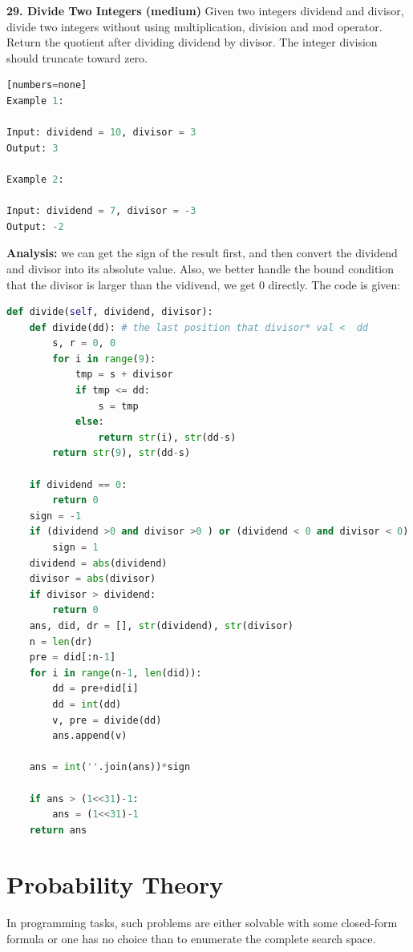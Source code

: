 \documentclass[../main.tex]{subfiles}
\begin{document}
\begin{examples}[resume]
\item \textbf{29. Divide Two Integers (medium)} Given two integers dividend and divisor, divide two integers without using multiplication, division and mod operator. Return the quotient after dividing dividend by divisor. The integer division should truncate toward zero.
\begin{lstlisting}[language=Python][numbers=none]
Example 1:

Input: dividend = 10, divisor = 3
Output: 3

Example 2:

Input: dividend = 7, divisor = -3
Output: -2
\end{lstlisting}

\textbf{Analysis:} we can get the sign of the result first, and then convert the dividend and divisor into its absolute value. Also, we better handle the bound condition that the divisor is larger than the vidivend, we get 0 directly. The code is given:
\begin{lstlisting}[language=Python]
def divide(self, dividend, divisor):
    def divide(dd): # the last position that divisor* val <  dd
        s, r = 0, 0
        for i in range(9):
            tmp = s + divisor
            if tmp <= dd:
                s = tmp
            else:
                return str(i), str(dd-s)
        return str(9), str(dd-s)
            
    if dividend == 0:
        return 0
    sign = -1
    if (dividend >0 and divisor >0 ) or (dividend < 0 and divisor < 0):
        sign = 1
    dividend = abs(dividend)
    divisor = abs(divisor)
    if divisor > dividend:
        return 0
    ans, did, dr = [], str(dividend), str(divisor)
    n = len(dr)
    pre = did[:n-1]
    for i in range(n-1, len(did)):
        dd = pre+did[i]
        dd = int(dd)
        v, pre = divide(dd)
        ans.append(v)
         
    ans = int(''.join(ans))*sign

    if ans > (1<<31)-1:
        ans = (1<<31)-1
    return ans
\end{lstlisting}
\end{examples}
\section{Probability Theory}
In programming tasks, such problems are either solvable with some closed-form formula or one has no choice than to enumerate the complete search space.
\end{document}
